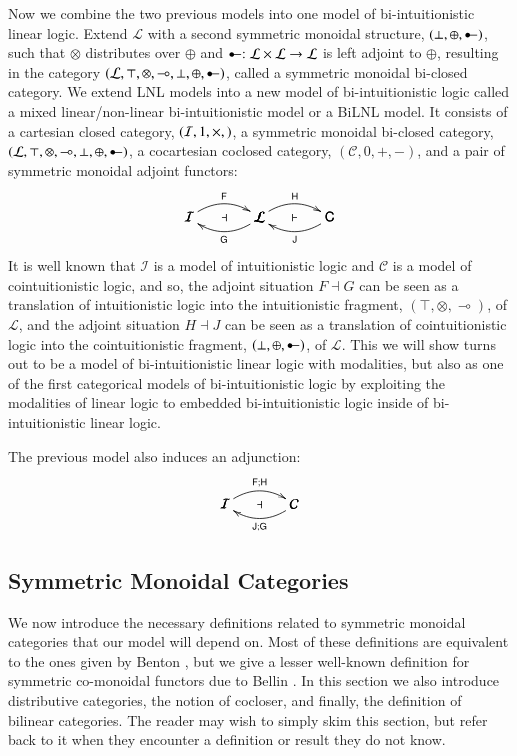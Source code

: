 \documentclass{lmcs}
\let\mto\to
\let\to\relax
\newcommand{\to}{\rightarrow}
\newcommand{\cat}[1]{\mathcal{#1}}
\newcommand{\func}[1]{\mathsf{#1}}
\newcommand{\limp}[0]{\multimap}
\newcommand{\colimp}[0]{\multimapdotinv}
\begin{document}
Now we combine the two previous models into one model of
bi-intuitionistic linear logic.  Extend $\cat{L}$ with a second
symmetric monoidal structure, $(\perp, \oplus, \colimp)$, such that
$\otimes$ distributes over $\oplus$ and $\colimp : \cat{L} \times
\cat{L} \mto \cat{L}$ is left adjoint to $\oplus$, resulting in the
category $(\cat{L}, \top, \otimes, \limp, \perp, \oplus, \colimp)$,
called a symmetric monoidal bi-closed category.  We extend LNL models
into a new model of bi-intuitionistic logic called a mixed
linear/non-linear bi-intuitionistic model or a BiLNL model.  It
consists of a cartesian closed category, $(\cat{I}, 1, \times, \to)$,
a symmetric monoidal bi-closed category, $(\cat{L}, \top,\otimes,
\limp, \perp, \oplus, \colimp)$, a cocartesian coclosed category,
$(\cat{C}, 0,+, -)$, and a pair of symmetric monoidal adjoint
functors:
$$\bfig
\morphism(0,0)|a|/{@{>}@/^1em/}/<500,0>[\cat{I}`\cat{L};\func{F}]
\morphism(0,0)|b|/{@{<-}@/_1em/}/<500,0>[\cat{I}`\cat{L};\mathsf{G}]
\morphism(500,0)|a|/{@{>}@/^1em/}/<500,0>[\cat{L}`\func{C};\func{H}]
\morphism(500,0)|b|/{@{<-}@/_1em/}/<500,0>[\cat{L}`\func{C};\func{J}]
\place(250,0)[\dashv] \place(750,0)[\vdash] \efig$$ It is well known
that $\cat{I}$ is a model of intuitionistic logic and $\cat{C}$ is a
model of cointuitionistic logic, and so, the adjoint situation $F
\dashv G$ can be seen as a translation of intuitionistic logic into
the intuitionistic fragment, $(\top, \otimes, \limp)$, of $\cat{L}$,
and the adjoint situation $H \dashv J$ can be seen as a translation of
cointuitionistic logic into the cointuitionistic fragment, $(\perp,
\oplus, \colimp)$, of $\cat{L}$.  This we will show turns out to be a
model of bi-intuitionistic linear logic with modalities, but also as
one of the first categorical models of bi-intuitionistic logic by
exploiting the modalities of linear logic to embedded
bi-intuitionistic logic inside of bi-intuitionistic linear logic.

The previous model also induces an adjunction:
$$\bfig
\morphism(0,0)|a|/{@{>}@/^1em/}/<500,0>[\cat{I}`\cat{C};\func{F};\func{H}]
\morphism(0,0)|b|/{@{<-}@/_1em/}/<500,0>[\cat{I}`\cat{C};\func{J};\func{G}]
\place(250,0)[\dashv]\efig$$

\subsection{Symmetric Monoidal Categories}
\label{subsec:symmetric_monoidal_categories}
We now introduce the necessary definitions related to symmetric
monoidal categories that our model will depend on.  Most of these
definitions are equivalent to the ones given by Benton
\cite{Benton:1994}, but we give a lesser well-known definition for
symmetric co-monoidal functors due to Bellin \cite{Bellin:2012}.  In
this section we also introduce distributive categories, the notion of
cocloser, and finally, the definition of bilinear categories.  The
reader may wish to simply skim this section, but refer back to it when
they encounter a definition or result they do not know.
\end{document}
